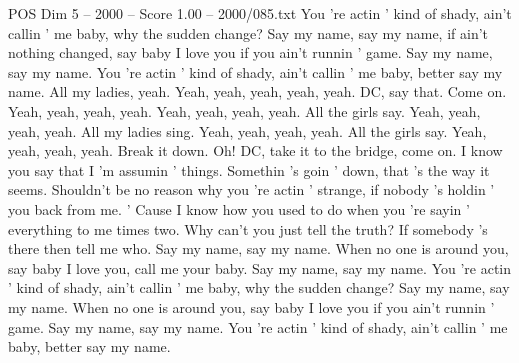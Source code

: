 \begin{textsample}{POS Dim 5 – 2000 – Score 1.00 – 2000/085.txt}
You 're actin ' kind of shady, ain't callin ' me baby, why the sudden change?
Say my name, say my name, if ain't nothing changed, say baby I love you if you ain't runnin ' game.
Say my name, say my name.
You 're actin ' kind of shady, ain't callin ' me baby, better say my name.
All my ladies, yeah.
Yeah, yeah, yeah, yeah, yeah.
DC, say that.
Come on.
Yeah, yeah, yeah, yeah.
Yeah, yeah, yeah, yeah.
All the girls say.
Yeah, yeah, yeah, yeah.
All my ladies sing.
Yeah, yeah, yeah, yeah.
All the girls say.
Yeah, yeah, yeah, yeah.
Break it down.
Oh!
DC, take it to the bridge, come on.
I know you say that I 'm assumin ' things.
Somethin 's goin ' down, that 's the way it seems.
Shouldn't be no reason why you 're actin ' strange, if nobody 's holdin ' you back from me. ' Cause I know how you used to do when you 're sayin ' everything to me times two.
Why can't you just tell the truth?
If somebody 's there then tell me who.
Say my name, say my name.
When no one is around you, say baby I love you, call me your baby.
Say my name, say my name.
You 're actin ' kind of shady, ain't callin ' me baby, why the sudden change?
Say my name, say my name.
When no one is around you, say baby I love you if you ain't runnin ' game.
Say my name, say my name.
You 're actin ' kind of shady, ain't callin ' me baby, better say my name.

\end{textsample}
